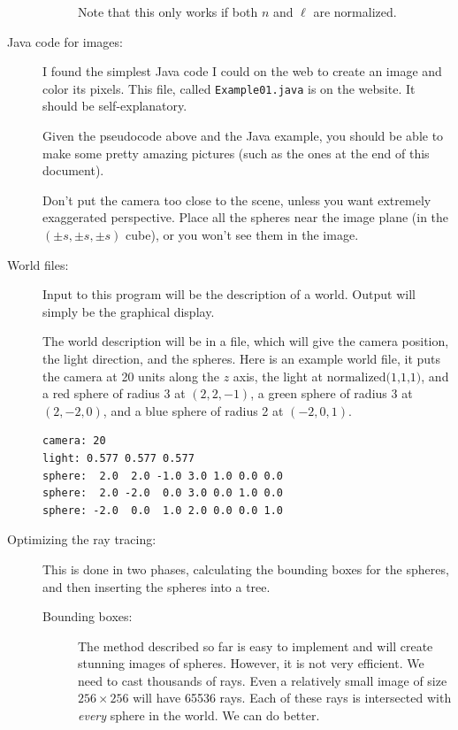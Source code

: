 \documentclass{article}
\begin{document}
\begin{description}
\begin{description}
Note that this only works if both $n$ and $\ell$ are normalized.

  \end{description}
  

\item[Java code for images:]
  I found the simplest Java code I could on the web to create an image
  and color its pixels.  This file, called {\tt Example01.java} is on
  the website.  It should be self-explanatory.

  Given the pseudocode above and the Java example, you should be able
  to make some pretty amazing pictures (such as the ones at the end of
  this document).

  Don't put the camera too close to the scene, unless you want
  extremely exaggerated perspective.  Place all the spheres near the
  image plane (in the $(\pm s, \pm s, \pm s)$ cube), or you won't see
  them in the image.

\item[World files:]  Input to this program will be the description of
  a world.  Output will simply be the graphical display.

  The world description will be in a file, which will give the camera
  position, the light direction, and the spheres.  Here is an example
  world file, it puts the camera at 20 units along the $z$ axis, the
  light at $\mbox{normalized(1,1,1)}$, and a red sphere of radius 3 at
  $(2,2,-1)$, a green sphere of radius 3 at $(2,-2,0)$, and a blue
  sphere of radius 2 at $(-2,0,1)$.

  \begin{Verbatim}[frame=single,label=myworld.wrl]
camera: 20
light: 0.577 0.577 0.577
sphere:  2.0  2.0 -1.0 3.0 1.0 0.0 0.0
sphere:  2.0 -2.0  0.0 3.0 0.0 1.0 0.0
sphere: -2.0  0.0  1.0 2.0 0.0 0.0 1.0
\end{Verbatim}

\item[Optimizing the ray tracing:]  This is done in two phases,
  calculating the bounding boxes for the spheres, and then inserting
  the spheres into a tree.

  \begin{description}
    \item[Bounding boxes:]
  The method described so far is easy to implement and will create
  stunning images of spheres.  However, it is not very efficient.  We
  need to cast thousands of rays.  Even a relatively small image of
  size $256\times256$ will have 65536 rays.  Each of these rays is
  intersected with {\em every} sphere in the world.  We can do better.


\end{description}
\end{description}
\end{document}
